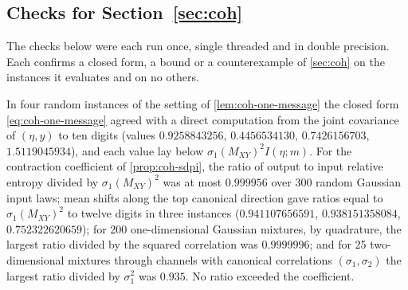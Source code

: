 \subsection{Checks for \texorpdfstring{Section~\ref{sec:coh}}{coherence}}\label{chk:coh}

The checks below were each run once, single threaded and in double precision. Each confirms a closed form, a bound or a counterexample of \cref{sec:coh} on the instances it evaluates and on no others.

\begin{numcheck}\label{chk:coh-sdpi}
In four random instances of the setting of \cref{lem:coh-one-message} the closed form \eqref{eq:coh-one-message} agreed with a direct computation from the joint covariance of $(\eta,y)$ to ten digits (values $0.9258843256$, $0.4456534130$, $0.7426156703$, $1.5119045934$), and each value lay below $\sigma_1(M_{XY})^2I(\eta;m)$. For the contraction coefficient of \cref{prop:coh-sdpi}, the ratio of output to input relative entropy divided by $\sigma_1(M_{XY})^2$ was at most $0.999956$ over 300 random Gaussian input laws; mean shifts along the top canonical direction gave ratios equal to $\sigma_1(M_{XY})^2$ to twelve digits in three instances ($0.941107656591$, $0.938151358084$, $0.752322620659$); for 200 one-dimensional Gaussian mixtures, by quadrature, the largest ratio divided by the squared correlation was $0.9999996$; and for 25 two-dimensional mixtures through channels with canonical correlations $(\sigma_1,\sigma_2)$ the largest ratio divided by $\sigma_1^2$ was $0.935$. No ratio exceeded the coefficient.
\end{numcheck}

